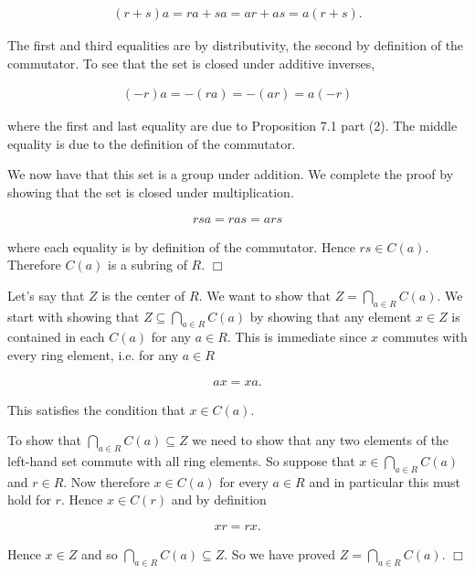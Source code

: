 \documentclass{article}
\begin{document}
  \begin{align*}
    (r+s)a = ra+sa = ar+as = a(r+s).
  \end{align*}

  The first and third equalities are by distributivity, the second by definition of the commutator.  To see that the set is closed under additive inverses,

  \begin{align*}
    (-r)a = -(ra) = -(ar) = a(-r)
  \end{align*}

  where the first and last equality are due to Proposition 7.1 part (2).  The middle equality is due to the definition of the commutator.

  We now have that this set is a group under addition.  We complete the proof by showing that the set is closed under multiplication.

  \begin{align*}
    rsa = ras = ars
  \end{align*}

  where each equality is by definition of the commutator.  Hence $rs\in C(a)$.  Therefore $C(a)$ is a subring of $R$.   $\Box$

  \vspace{1cm}

  Let's say that $Z$ is the center of $R$.  We want to show that $\displaystyle Z = \bigcap_{a\in R} C(a)$.  We start with showing that $Z \subseteq \displaystyle \bigcap_{a\in R} C(a)$ by showing that any element $x\in Z$ is contained in each $C(a)$ for any $a\in R$.  This is immediate since $x$ commutes with every ring element, i.e. for any $a\in R$

  \begin{align*}
    ax = xa.
  \end{align*}

  This satisfies the condition that $x\in C(a)$.

  To show that $\displaystyle \bigcap_{a\in R} C(a) \subseteq Z$ we need to show that any two elements of the left-hand set commute with all ring elements.  So suppose that $x\in \displaystyle \bigcap_{a\in R}C(a)$ and $r\in R$.  Now therefore $x\in C(a)$ for every $a\in R$ and in particular this must hold for $r$.  Hence $x\in C(r)$ and by definition

  \begin{align*}
    xr = rx.
  \end{align*}

  Hence $x\in Z$ and so $\displaystyle \bigcap_{a\in R} C(a) \subseteq Z.$  So we have proved $\displaystyle Z = \bigcap_{a\in R} C(a)$. $\Box$
\end{document}
